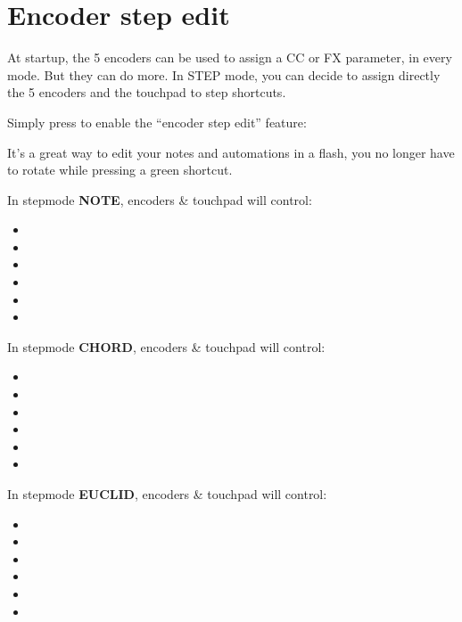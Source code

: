 \section{Encoder step edit}

At startup, the 5 encoders \encodersicon{} can be used to assign a CC or FX parameter, in every mode. But they can do more. In STEP mode, you can decide to assign directly the 5 encoders and the touchpad to step shortcuts.

Simply press  to enable the ``encoder step edit'' feature:


It's a great way to edit your notes and automations in a flash, you no longer have to rotate \encodericon{} while pressing a green shortcut.

In stepmode \textbf{NOTE}, encoders \& touchpad will control:

\begin{itemize}
\item {}
\item {}
\item {}
\item {}
\item {}
\item {}
\end{itemize}

In stepmode \textbf{CHORD}, encoders \& touchpad will control:

\begin{itemize}
\item {}
\item {}
\item {}
\item {}
\item {}
\item {}
\end{itemize}

In stepmode \textbf{EUCLID}, encoders \& touchpad will control:

\begin{itemize}
\item {}
\item {}
\item {}
\item {}
\item {}
\item {}
\end{itemize}

